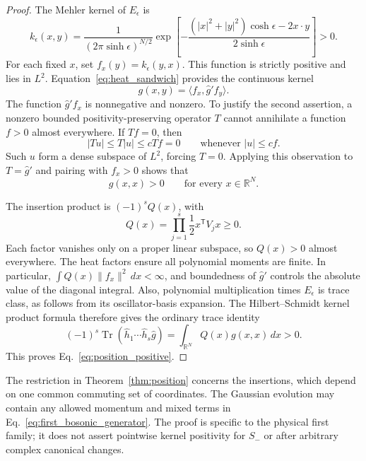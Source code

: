 \documentclass[11pt,a4paper]{article}
\newcommand{\Tr}{\operatorname{Tr}}
\newcommand{\trans}{\mathsf T}
\theoremstyle{remark}
\numberwithin{equation}{section}
\begin{document}
\begin{proof}
The Mehler kernel of \(E_\epsilon\) is
\begin{equation}
k_\epsilon(x,y)=\frac1{(2\pi\sinh\epsilon)^{N/2}}
\exp\!\left[-\frac{(|x|^2+|y|^2)\cosh\epsilon-2x\cdot y}
{2\sinh\epsilon}\right]>0.
\label{eq:mehler_kernel}
\end{equation}
For each fixed \(x\), set \(f_x(y)=k_\epsilon(y,x)\). This function is
strictly positive and lies in \(L^2\). Equation~\eqref{eq:heat_sandwich}
provides the continuous kernel
\begin{equation}
g(x,y)=\langle f_x,\hat g'f_y\rangle.
\label{eq:sandwich_kernel}
\end{equation}
The function \(\hat g'f_x\) is nonnegative and nonzero. To justify the
second assertion, a nonzero bounded positivity-preserving operator \(T\)
cannot annihilate a function \(f>0\) almost everywhere. If \(Tf=0\), then
\begin{equation}
|Tu|\leq T|u|\leq cTf=0
\qquad\text{whenever }|u|\leq cf.
\end{equation}
Such \(u\) form a dense subspace of \(L^2\), forcing \(T=0\).
Applying this observation to \(T=\hat g'\) and pairing with \(f_x>0\)
shows that
\begin{equation}
g(x,x)>0\qquad\text{for every }x\in\mathbb R^N.
\label{eq:positive_diagonal}
\end{equation}

The insertion product is \((-1)^sQ(x)\), with
\begin{equation}
Q(x)=\prod_{j=1}^s\frac12x^\trans V_jx\geq0.
\end{equation}
Each factor vanishes only on a proper linear subspace, so \(Q(x)>0\)
almost everywhere. The heat factors ensure all polynomial moments are
finite. In particular,
\(\int Q(x)\|f_x\|^2\,dx<\infty\), and boundedness of \(\hat g'\)
controls the absolute value of the diagonal integral. Also, polynomial
multiplication times \(E_\epsilon\) is trace class, as follows from its
oscillator-basis expansion. The Hilbert--Schmidt kernel product formula
therefore gives the ordinary trace identity
\begin{equation}
(-1)^s\Tr(\hat h_1\cdots\hat h_s\hat g)
=\int_{\mathbb R^N}Q(x)g(x,x)\,dx>0.
\label{eq:positive_integral}
\end{equation}
This proves Eq.~\eqref{eq:position_positive}.
\end{proof}

The restriction in Theorem~\ref{thm:position} concerns the insertions, which
depend on one common commuting set of coordinates. The Gaussian evolution
may contain any allowed momentum and mixed terms in
Eq.~\eqref{eq:first_bosonic_generator}. The proof is specific to the
physical first family; it does not assert pointwise kernel positivity for
\(S_-\) or after arbitrary complex canonical changes.
\end{document}
